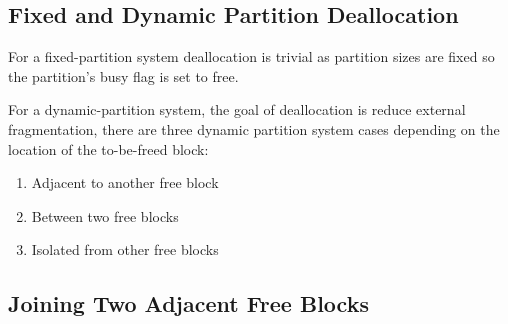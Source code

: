 \documentclass[12pt letter]{report}
\begin{document}



\subsection{Fixed and Dynamic Partition Deallocation}
For a fixed-partition system deallocation is trivial as partition sizes are fixed so the partition's busy flag is set to free.

For a dynamic-partition system, the goal of deallocation is reduce external fragmentation, there are three dynamic partition system cases depending on the location of the to-be-freed block:
\begin{enumerate}
  \item Adjacent to another free block
  \item Between two free blocks
  \item Isolated from other free blocks
\end{enumerate}

\subsection{Joining Two Adjacent Free Blocks}
\end{document}
